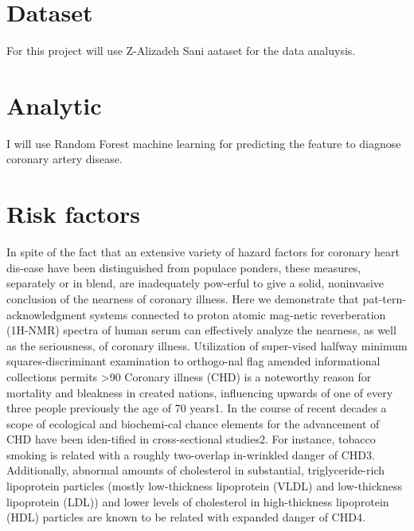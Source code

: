 \documentclass[sigconf]{acmart}
\begin{document}
\section{Dataset}
For this project  will use Z-Alizadeh Sani aataset for the data analuysis.
    
\section{Analytic}
    I will use Random Forest machine learning for predicting the feature to diagnose coronary artery disease.

\section{Risk factors}
\par In spite of the fact that an extensive variety of hazard factors for coronary heart dis-ease have been distinguished from populace ponders, these measures, separately or in blend, are inadequately pow-erful to give a solid, noninvasive conclusion of the nearness of coronary illness. Here we demonstrate that pat-tern-acknowledgment systems connected to proton atomic mag-netic reverberation (1H-NMR) spectra of human serum can effectively analyze the nearness, as well as the seriousness, of coronary illness. Utilization of super-vised halfway minimum squares-discriminant examination to orthogo-nal flag amended informational collections permits >90%
Coronary illness (CHD) is a noteworthy reason for mortality and bleakness in created nations, influencing upwards of one of every three people previously the age of 70 years1. In the course of recent decades a scope of ecological and biochemi-cal chance elements for the advancement of CHD have been iden-tified in cross-sectional studies2. For instance, tobacco smoking is related with a roughly two-overlap in-wrinkled danger of CHD3. Additionally, abnormal amounts of cholesterol in substantial, triglyceride-rich lipoprotein particles (mostly low-thickness lipoprotein (VLDL) and low-thickness lipoprotein (LDL)) and lower levels of cholesterol in high-thickness lipoprotein (HDL) particles are known to be related with expanded danger of CHD4.
\end{document}
